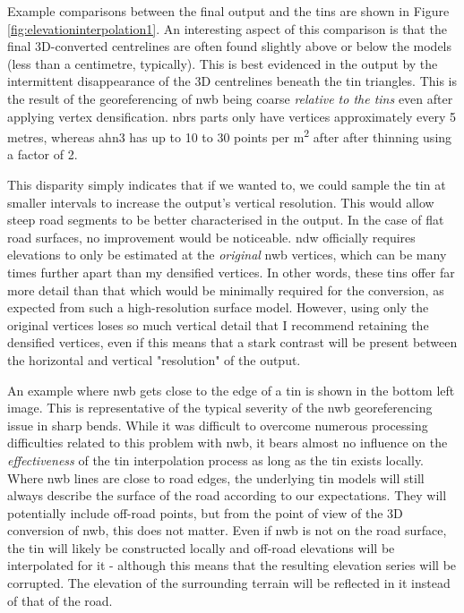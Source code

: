 Example comparisons between the final output and the \ac{tin}s are shown in Figure \ref{fig:elevationinterpolation1}. An interesting aspect of this comparison is that the final 3D-converted centrelines are often found slightly above or below the models (less than a centimetre, typically). This is best evidenced in the output by the intermittent disappearance of the 3D centrelines beneath the \ac{tin} triangles. This is the result of the georeferencing of \ac{nwb} being coarse \textit{relative to the \ac{tin}s} even after applying vertex densification. \ac{nbrs} parts only have vertices approximately every 5 metres, whereas \ac{ahn3} has up to 10 to 30 points per m\textsuperscript{2} after after thinning using a factor of 2.

This disparity simply indicates that if we wanted to, we could sample the \ac{tin} at smaller intervals to increase the output's vertical resolution. This would allow steep road segments to be better characterised in the output. In the case of flat road surfaces, no improvement would be noticeable. \ac{ndw} officially requires elevations to only be estimated at the \textit{original} \ac{nwb} vertices, which can be many times further apart than my densified vertices. In other words, these \ac{tin}s offer far more detail than that which would be minimally required for the conversion, as expected from such a high-resolution surface model. However, using only the original vertices loses so much vertical detail that I recommend retaining the densified vertices, even if this means that a stark contrast will be present between the horizontal and vertical "resolution" of the output.

An example where \ac{nwb} gets close to the edge of a \ac{tin} is shown in the bottom left image. This is representative of the typical severity of the \ac{nwb} georeferencing issue in sharp bends. While it was difficult to overcome numerous processing difficulties related to this problem with \ac{nwb}, it bears almost no influence on the \textit{effectiveness} of the \ac{tin} interpolation process as long as the \ac{tin} exists locally. Where \ac{nwb} lines are close to road edges, the underlying \ac{tin} models will still always describe the surface of the road according to our expectations. They will potentially include off-road points, but from the point of view of the 3D conversion of \ac{nwb}, this does not matter. Even if \ac{nwb} is not on the road surface, the \ac{tin} will likely be constructed locally and off-road elevations will be interpolated for it - although this means that the resulting elevation series will be corrupted. The elevation of the surrounding terrain will be reflected in it instead of that of the road.

